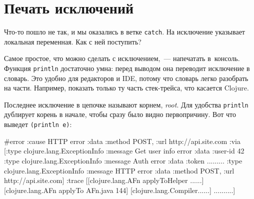 \fi

\section{Печать исключений}

Что-то пошло не так, и мы оказались в ветке \verb|catch|. На исключение
указывает локальная переменная. Как с ней поступить?

Самое простое, что можно сделать с исключением,~--- напечатать в~консоль. Функция
\verb|println| достаточно умна: перед выводом она переводит исключение в
словарь. Это удобно для редакторов и IDE, потому что словарь легко разобрать на
части. Например, показать только ту часть стек-трейса, что касается Clojure.

Последнее исключение в цепочке называют корнем, \emph{root}. Для удобства
\verb|println| дублирует корень в начале, чтобы сразу было видно
первопричину. Вот что выведет \verb|(println e)|:


\ifx\devicetype\mobile

\begin{english}
  \begin{clojure}
#error {
 :cause HTTP error
 :data {:method POST,
        :url http://api.site.com}
 :via
 [{:type clojure.lang.ExceptionInfo
   :message Get user info error
   :data {:user-id 42}}
  {:type clojure.lang.ExceptionInfo
   :message Auth error
   :data {:token .........}}
  {:type clojure.lang.ExceptionInfo
   :message HTTP error
   :data {:method POST,
          :url http://api.site.com}}]
 :trace
 [[clojure.lang.AFn applyToHelper ......]
  [clojure.lang.AFn applyTo AFn.java 144]
  [clojure.lang.Compiler......]
  ..........]}
  \end{clojure}
\end{english}

\else

\begin{english}
\end{english}

